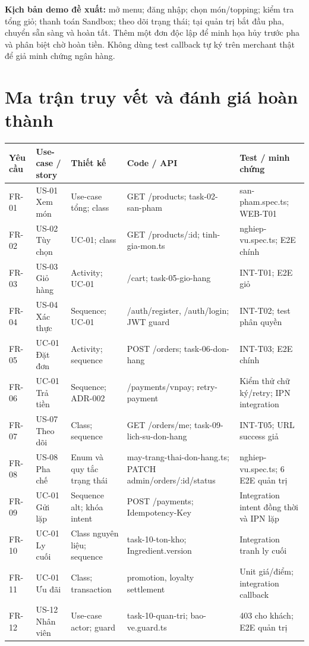 \documentclass[12pt,a4paper]{article}
\begin{document}
\textbf{Kịch bản demo đề xuất:} mở menu; đăng nhập; chọn món/topping; kiểm tra tổng giỏ; thanh toán Sandbox; theo dõi trạng thái; tại quản trị bắt đầu pha, chuyển sẵn sàng và hoàn tất. Thêm một đơn độc lập để minh họa hủy trước pha và phân biệt chờ hoàn tiền. Không dùng test callback tự ký trên merchant thật để giả minh chứng ngân hàng.

\clearpage
\section{Ma trận truy vết và đánh giá hoàn thành}
\small
\begin{longtable}{P{1.35cm}P{2.0cm}P{3.0cm}P{4.0cm}P{3.8cm}}
\toprule\textbf{Yêu cầu}&\textbf{Use-case / story}&\textbf{Thiết kế}&\textbf{Code / API}&\textbf{Test / minh chứng}\\\midrule\endhead
FR-01&US-01 Xem món&Use-case tổng; class&GET /products; task-02-san-pham&san-pham.spec.ts; WEB-T01\\
FR-02&US-02 Tùy chọn&UC-01; class&GET /products/:id; tinh-gia-mon.ts&nghiep-vu.spec.ts; E2E chính\\
FR-03&US-03 Giỏ hàng&Activity; UC-01&/cart; task-05-gio-hang&INT-T01; E2E giỏ\\
FR-04&US-04 Xác thực&Sequence; UC-01&/auth/register, /auth/login; JWT guard&INT-T02; test phân quyền\\
FR-05&UC-01 Đặt đơn&Activity; sequence&POST /orders; task-06-don-hang&INT-T03; E2E chính\\
FR-06&UC-01 Trả tiền&Sequence; ADR-002&/payments/vnpay; retry-payment&Kiểm thử chữ ký/retry; IPN integration\\
FR-07&US-07 Theo dõi&Class; sequence&GET /orders/me; task-09-lich-su-don-hang&INT-T05; URL success giả\\
FR-08&US-08 Pha chế&Enum và quy tắc trạng thái&may-trang-thai-don-hang.ts; PATCH admin/orders/:id/status&nghiep-vu.spec.ts; 6 E2E quản trị\\
FR-09&UC-01 Gửi lặp&Sequence alt; khóa intent&POST /payments; Idempotency-Key&Integration intent đồng thời và IPN lặp\\
FR-10&UC-01 Ly cuối&Class nguyên liệu; sequence&task-10-ton-kho; Ingredient.version&Integration tranh ly cuối\\
FR-11&UC-01 Ưu đãi&Class; transaction&promotion, loyalty settlement&Unit giá/điểm; integration callback\\
FR-12&US-12 Nhân viên&Use-case actor; guard&task-10-quan-tri; bao-ve.guard.ts&403 cho khách; E2E quản trị\\

\end{longtable}
\end{document}
